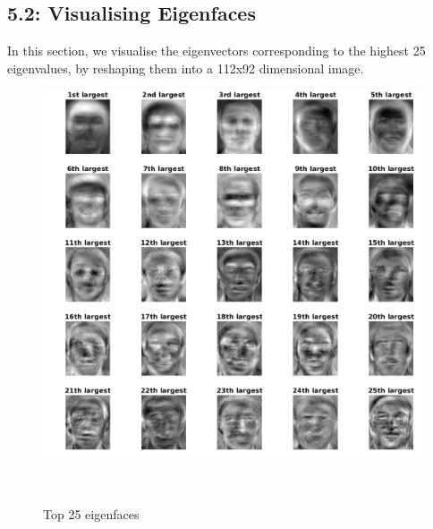 \documentclass[12pt, a4paper]{article}
\begin{document}
\newpage
\subsection*{5.2: Visualising Eigenfaces}
\quad In this section, we visualise the eigenvectors corresponding to the highest 25 eigenvalues, by reshaping them into a 112x92 dimensional image.
\vspace*{65pt}
\begin{figure}[h!]
    \centering
    \renewcommand{\thefigure}{5.2}
    \begin{minipage}[c][1\width]{0.8\textwidth}
    	\hspace*{-1in}
    	\includegraphics[width=1.34\textwidth]{eigenfaces.png}
    	\caption{Top 25 eigenfaces}
	    \label{fig:5.2}
    \end{minipage} \\
\end{figure}

\newpage
\end{document}
